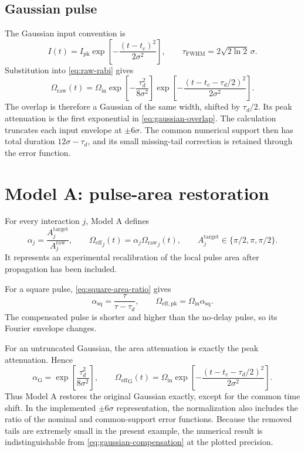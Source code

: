 \documentclass[11pt,a4paper]{article}
\newcommand{\taud}{\tau_{d}}
\newcommand{\Oraw}{\Omega_{\mathrm{raw}}}
\newcommand{\Oeff}{\Omega_{\mathrm{eff}}}
\begin{document}
\subsection{Gaussian pulse}

The Gaussian input convention is
\begin{equation}
 I(t)=I_{\mathrm{pk}}\exp\!\left[-\frac{(t-t_c)^2}{2\sigma^2}\right],
 \qquad \tau_{\mathrm{FWHM}}=2\sqrt{2\ln2}\,\sigma.
 \label{eq:gaussian-input}
\end{equation}
Substitution into \cref{eq:raw-rabi} gives
\begin{equation}
 \Oraw(t)=\Omega_{\mathrm{in}}
 \exp\!\left[-\frac{\taud^2}{8\sigma^2}\right]
 \exp\!\left[-\frac{(t-t_c-\taud/2)^2}{2\sigma^2}\right].
 \label{eq:gaussian-overlap}
\end{equation}
The overlap is therefore a Gaussian of the same width, shifted by $\taud/2$. Its peak attenuation is the first exponential in \cref{eq:gaussian-overlap}. The calculation truncates each input envelope at $\pm6\sigma$. The common numerical support then has total duration $12\sigma-\taud$, and its small missing-tail correction is retained through the error function.

\section{Model A: pulse-area restoration}

For every interaction $j$, Model A defines
\begin{equation}
 \alpha_j=\frac{A_j^{\mathrm{target}}}{A_j^{\mathrm{raw}}},
 \qquad
 {\Oeff}_j(t)=\alpha_j{\Oraw}_j(t),
 \qquad
 A_j^{\mathrm{target}}\in\{\pi/2,\pi,\pi/2\}.
 \label{eq:model-a}
\end{equation}
It represents an experimental recalibration of the local pulse area after propagation has been included.

For a square pulse, \cref{eq:square-area-ratio} gives
\begin{equation}
 \alpha_{\mathrm{sq}}=\frac{\tau}{\tau-\taud},
 \qquad
 \Omega_{\mathrm{eff,pk}}=\Omega_{\mathrm{in}}\alpha_{\mathrm{sq}}.
 \label{eq:square-compensation}
\end{equation}
The compensated pulse is shorter and higher than the no-delay pulse, so its Fourier envelope changes.

For an untruncated Gaussian, the area attenuation is exactly the peak attenuation. Hence
\begin{equation}
 \alpha_{\mathrm{G}}=\exp\!\left[\frac{\taud^2}{8\sigma^2}\right],
 \qquad
 {\Oeff}_{\mathrm{G}}(t)=\Omega_{\mathrm{in}}
 \exp\!\left[-\frac{(t-t_c-\taud/2)^2}{2\sigma^2}\right].
 \label{eq:gaussian-compensation}
\end{equation}
Thus Model A restores the original Gaussian exactly, except for the common time shift. In the implemented $\pm6\sigma$ representation, the normalization also includes the ratio of the nominal and common-support error functions. Because the removed tails are extremely small in the present example, the numerical result is indistinguishable from \cref{eq:gaussian-compensation} at the plotted precision.
\end{document}

